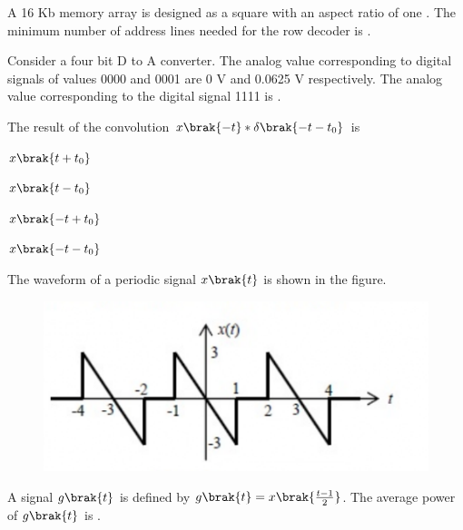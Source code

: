     \hfill{}

    \item A 16 Kb  memory array is designed as a square with an aspect ratio of one . The minimum number of address lines needed for the row decoder is \underline{\hspace{2cm}}.
    
    \hfill{}

    \item Consider a four bit D to A converter. The analog value corresponding to digital signals of values 0000 and 0001 are 0 V and 0.0625 V respectively. The analog value  corresponding to the digital signal 1111 is \underline{\hspace{2cm}}.
    
    \hfill{}

    \item The result of the convolution $x\brak{-t}*\delta\brak{-t-t_{0}}$ is
    \begin{enumerate}
        \begin{multicols}{4}
            \item $x\brak{t+t_{0}}$
            \item $x\brak{t-t_{0}}$
            \item $x\brak{-t+t_{0}}$
            \item $x\brak{-t-t_{0}}$
        \end{multicols}
    \end{enumerate}
    
    \hfill{}

    \item The waveform of a periodic signal $x\brak{t}$ is shown in the figure.
    \begin{figure}[H]
        \centering
        \includegraphics[width=0.5\columnwidth]{figs/q28.png}
        \caption*{}
        \label{fig:q28}
    \end{figure}
    A signal $g\brak{t}$ is defined by $g\brak{t}=x\brak{\frac{t-1}{2}}$. The average power of $g\brak{t}$ is \underline{\hspace{2cm}}.
    
